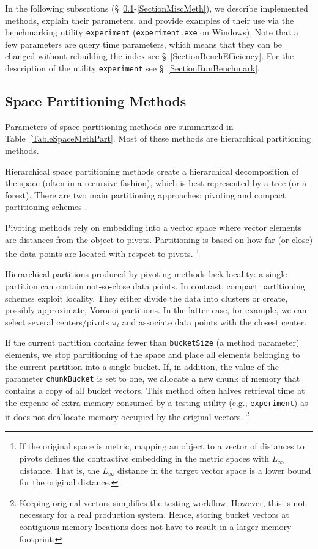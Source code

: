 \documentclass[runningheads,a4paper]{llncs}
\newcommand{\ttt}[1]{\texttt{#1}}
\begin{document}
{In the following subsections (\S~\ref{SectionSpacePartMeth}-\ref{SectionMiscMeth}),
we describe implemented methods, explain their parameters,
and provide examples of their use via the benchmarking utility \ttt{experiment} (\ttt{experiment.exe} on Windows).
Note that a few parameters are query time parameters, which means that they 
can be changed without rebuilding the index see \S~\ref{SectionBenchEfficiency}.
For the description of the utility \ttt{experiment} see \S~\ref{SectionRunBenchmark}.

\subsection{Space Partitioning Methods} \label{SectionSpacePartMeth} 
Parameters of space partitioning methods are summarized in Table~\ref{TableSpaceMethPart}.
Most of these methods are hierarchical partitioning methods.

Hierarchical space partitioning methods create a hierarchical decomposition of the space
(often in a recursive fashion),
which is best represented by a tree (or a forest). 
There are two main partitioning approaches: 
pivoting and compact partitioning schemes  \cite{Chavez_et_al:2001a}.

Pivoting methods rely on embedding into a vector space where vector elements are distances
from the object to pivots.
Partitioning is based on how far (or close) the data points are located with respect to pivots.
\footnote{If the original space is metric, mapping an object to a vector of distances to pivots 
defines the contractive embedding in the metric spaces with $L_{\infty}$ distance.
That is, the $L_{\infty}$ distance in the target vector space is a lower bound for the original distance.}

Hierarchical partitions produced by pivoting methods lack locality: a single partition can contain
not-so-close data points. In contrast, compact partitioning schemes exploit locality.
They either divide the data into clusters or create, possibly approximate, Voronoi partitions.
In the latter case, for example, we can select several centers/pivots $\pi_i$ and associate 
data points with the closest center.

If the current partition contains fewer than \ttt{bucketSize} (a method parameter) elements,
we stop partitioning of the space and place all elements
belonging to the current partition into a single bucket. 
If, in addition, the value of the parameter \ttt{chunkBucket} is set to one,
we allocate a new chunk of memory that contains a copy of all bucket vectors.
This method often halves retrieval time
at the expense of extra memory consumed by a testing utility (e.g., \ttt{experiment}) as it does not deallocate memory occupied by the original vectors. \footnote{Keeping original vectors simplifies the testing workflow.
However, this is not necessary for a real production system.
Hence, storing bucket vectors at contiguous memory locations does not have to result in a larger memory footprint.}

}
\end{document}
